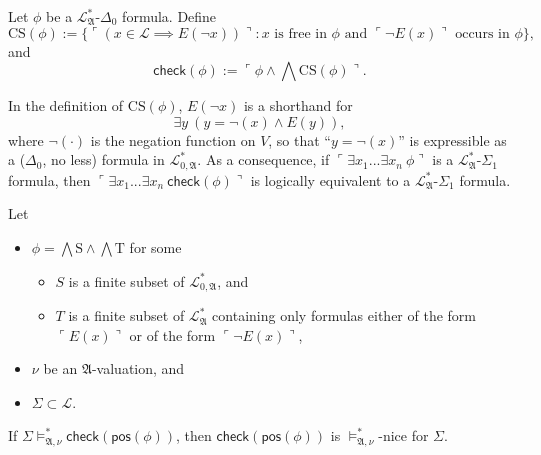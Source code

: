 \documentclass[12pt]{article}
\numberwithin{equation}{section}
\begin{document}
\begin{defi}\label{check}
Let $\phi$ be a $\mathcal{L}^{*}_{\mathfrak{A}}$-$\Delta_0$ formula. Define $$\mathrm{CS}(\phi) := \{\ulcorner (x \in \mathcal{L} \implies E(\neg x)) \urcorner : x \text{ is free in } \phi \text{ and } \ulcorner \neg E(x) \urcorner \text{ occurs in } \phi\},$$ and $$\mathsf{check}(\phi) := \ulcorner \phi \wedge \bigwedge \mathrm{CS}(\phi) \urcorner.$$
\end{defi}

\begin{rem}\label{shcs}
In the definition of $\mathrm{CS}(\phi)$, $E(\neg x)$ is a shorthand for $$\exists y \ (y = \neg (x) \wedge E(y)),$$ where $\neg (\cdot)$ is the negation function on $V$, so that ``$y = \neg (x)$'' is expressible as a ($\Delta_0$, no less) formula in $\mathcal{L}^{*}_{0, \mathfrak{A}}$. As a consequence, if $\ulcorner \exists x_1 ... \exists x_n \ \phi \urcorner$ is a $\mathcal{L}^{*}_{\mathfrak{A}}$-$\Sigma_1$ formula, then $\ulcorner \exists x_1 ... \exists x_n \ \mathsf{check}(\phi) \urcorner$ is logically equivalent to a $\mathcal{L}^{*}_{\mathfrak{A}}$-$\Sigma_1$ formula.
\end{rem}

\begin{lem}\label{postrue}
Let 
\begin{itemize}
    \item $\phi = \bigwedge \mathrm{S} \wedge \bigwedge \mathrm{T}$ for some 
    \begin{itemize}[label=$\circ$]
        \item $S$ is a finite subset of $\mathcal{L}^{*}_{0, \mathfrak{A}}$, and
        \item $T$ is a finite subset of $\mathcal{L}^{*}_{\mathfrak{A}}$ containing only formulas either of the form $\ulcorner E(x) \urcorner$ or of the form $\ulcorner \neg E(x) \urcorner$,
    \end{itemize}
    \item $\nu$ be an $\mathfrak{A}$-valuation, and
    \item $\Sigma \subset \mathcal{L}$.
\end{itemize}
If $\Sigma \models^*_{\mathfrak{A}, \nu} \mathsf{check}(\mathsf{pos}(\phi))$, then $\mathsf{check}(\mathsf{pos}(\phi))$ is $\models^*_{\mathfrak{A}, \nu}$-nice for $\Sigma$.
\end{lem}
\end{document}
